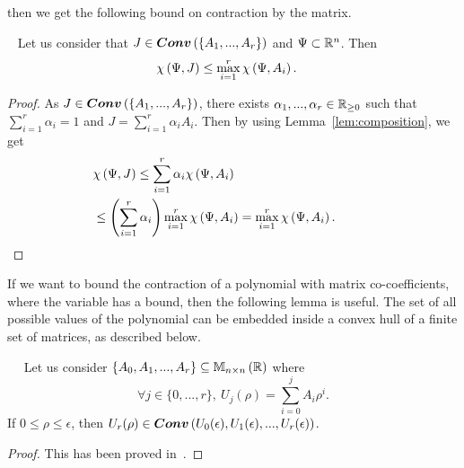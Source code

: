 then we get the following bound on contraction by the matrix.
%
\begin{lemma}~\label{lem:conv-bound}
Let us consider that $J\in\bm{Conv}\left(\left\{A_1,...,A_r\right\}\right)$ and
$\Psi\subset\mathbb{R}^n$.  Then
%
\begin{align*}
& \chi\left(\Psi,J\right)\leq\max_{i=1}^r\chi\left(\Psi,A_i\right).
\end{align*}
%
\end{lemma}
%
\begin{proof}
As $J\in\bm{Conv}\left(\left\{A_1,...,A_r\right\}\right)$, there exists
$\alpha_1,...,\alpha_r\in\mathbb{R}_{\geq 0}$ such that
$\sum_{i=1}^r\alpha_i=1$ and $J=\sum_{i=1}^r\alpha_iA_i$.  Then by
using Lemma~\ref{lem:composition}, we get
%
\begin{align*}
  & \chi\left(\Psi,J\right)\leq\sum_{i=1}^r\alpha_i\chi\left(\Psi,A_i\right)\\
  & \leq \left(\sum_{i=1}^r\alpha_i\right)\max_{i=1}^r\chi\left(\Psi,A_i\right)=\max_{i=1}^r\chi\left(\Psi,A_i\right).\hspace{3em}\qedhere
\end{align*}
%
\end{proof}
%
If we want to bound the contraction of a polynomial with matrix
co-coefficients, where the variable has a bound, then the following
lemma is useful.  The set of all possible values of
the polynomial can be embedded inside a convex hull of a finite set of
matrices, as described below.
%
\begin{lem}~\label{lem:convex}~\cite{2013hetel}
Let us consider $\left\{A_0,A_1,...,A_r\right\}\subseteq\mathbb{M}_{n\times n}\left(\mathbb{R}\right)$ where
%
\[
\forall j\in\{0,...,r\},~ U_j(\rho)=\sum_{i=0}^jA_i\rho^i.
\]
%
If
$0\leq\rho\leq \epsilon$, then $U_r(\rho)\in
\bm{Conv}\left(U_0(\epsilon),U_1(\epsilon),...,U_r(\epsilon)\right)$.
\end{lem}
\begin{proof}
This has been proved in~\cite{2013hetel}.
\end{proof}


